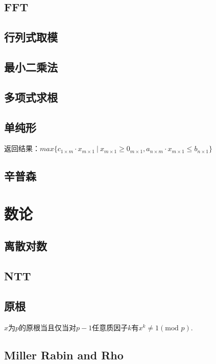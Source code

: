 \documentclass[landscape,a4paper]{article}
\begin{document}
\begin{spacing}{0.3}
\begin{multicols}{3}
	\subsection{FFT}
	
	\subsection{行列式取模}
	
	\subsection{最小二乘法}
	
	\subsection{多项式求根}
	
	\subsection{单纯形}
	返回结果：$max\{c_{1 \times m} \cdot x_{m \times 1} \ | \ x_{m \times 1} \geq 0_{m \times 1}, a_{n \times m} \cdot x_{m \times 1} \leq b_{n \times 1}\}$

	
	\subsection{辛普森}
	
	
	
	
	\section{数论}
	\subsection{离散对数}
	
	\subsection{NTT}
	
	\subsection{原根}
	$x$为$p$的原根当且仅当对$p-1$任意质因子$k$有$x^{k}\neq 1(\text{mod } p)$.
	\subsection{Miller Rabin and Rho}
	

\end{multicols}
\end{spacing}
\end{document}
